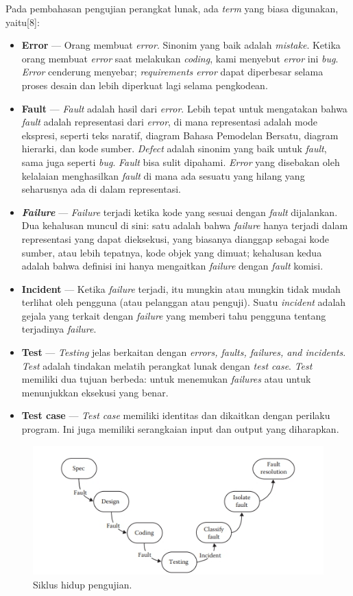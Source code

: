 Pada pembahasan pengujian perangkat lunak, ada \textit{term} yang biasa digunakan, yaitu[8]:
\begin{itemize}
\item \textbf{Error} --- Orang membuat \textit{error}. Sinonim yang baik adalah \textit{mistake}. Ketika orang membuat \textit{error} saat melakukan \textit{coding}, kami menyebut \textit{error} ini \textit{bug}. \textit{Error} cenderung menyebar; \textit{requirements error} dapat diperbesar selama proses desain dan lebih diperkuat lagi selama pengkodean.
\item \textbf{Fault} --- \textit{Fault} adalah hasil dari \textit{error}. Lebih tepat untuk mengatakan bahwa \textit{fault} adalah representasi dari \textit{error}, di mana representasi adalah mode ekspresi, seperti teks naratif, diagram Bahasa Pemodelan Bersatu, diagram hierarki, dan kode sumber. \textit{Defect} adalah sinonim yang baik untuk \textit{fault}, sama juga seperti \textit{bug}. \textit{Fault} bisa sulit dipahami. \textit{Error} yang disebakan oleh kelalaian menghasilkan \textit{fault} di mana ada sesuatu yang hilang yang seharusnya ada di dalam representasi.
\item \textit{\textbf{Failure}} --- \textit{Failure} terjadi ketika kode yang sesuai dengan \textit{fault} dijalankan. Dua kehalusan muncul di sini: satu adalah bahwa \textit{failure} hanya terjadi dalam representasi yang dapat dieksekusi, yang biasanya dianggap sebagai kode sumber, atau lebih tepatnya, kode objek yang dimuat; kehalusan kedua adalah bahwa definisi ini hanya mengaitkan \textit{failure} dengan \textit{fault} komisi.
\item \textbf{Incident} --- Ketika \textit{failure} terjadi, itu mungkin atau mungkin tidak mudah terlihat oleh pengguna (atau pelanggan atau penguji). Suatu \textit{incident} adalah gejala yang terkait dengan \textit{failure} yang memberi tahu pengguna tentang terjadinya \textit{failure}.
\item \textbf{Test} --- \textit{Testing} jelas berkaitan dengan  \textit{errors, faults, failures, and incidents}. \textit{Test} adalah tindakan melatih perangkat lunak dengan \textit{test case}. \textit{Test} memiliki dua tujuan berbeda: untuk menemukan \textit{failures} atau untuk menunjukkan eksekusi yang benar.
\item \textbf{Test case} --- \textit{Test case} memiliki identitas dan dikaitkan dengan perilaku program. Ini juga memiliki serangkaian input dan output yang diharapkan.
\end{itemize}
\begin{figure}
	\includegraphics[scale=1.2]{gambar/cycle}
	\centering
	\caption{Siklus hidup pengujian.}
\end{figure}
